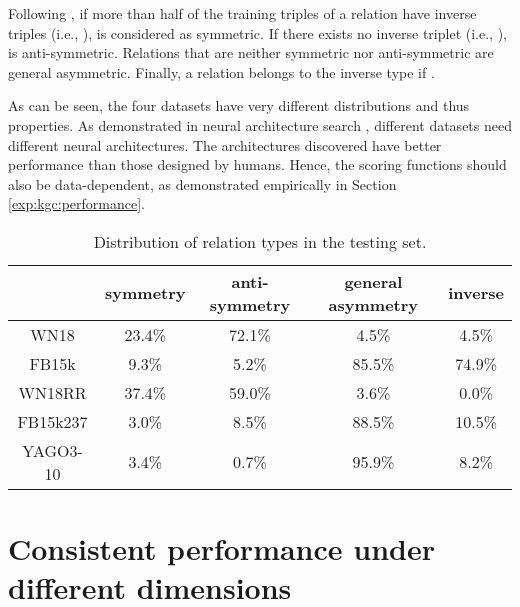 \documentclass[10pt,journal,compsoc]{IEEEtran}
\begin{document}
Following \cite{rossi2020knowledge},
if more than half of the training triples 
of a relation 
have
inverse triples 
(i.e.,
),
 is considered as symmetric.
If there exists no inverse triplet
(i.e., ),
 is anti-symmetric.
Relations that are neither 
symmetric nor
anti-symmetric
are general asymmetric.
Finally, a relation  belongs to the inverse type
if .


As can be seen, the four datasets have very 
different distributions and thus properties.
As demonstrated in neural architecture search
\cite{elsken2019neural,liu2018darts,zoph2017neural},
different datasets need different neural architectures.
The architectures discovered have better performance than those
designed by
humans.
Hence,
the scoring functions should also be data-dependent, 
as demonstrated empirically
in Section \ref{exp:kgc:performance}.

\begin{table}[ht]
	\centering
	\caption{Distribution of relation types in the testing set.}
	\label{tb:rel-distribution}
	\setlength\tabcolsep{3.1pt}
	\vspace{-10px}
	\begin{tabular}{c|ccc|c}
		\toprule
		& symmetry & anti-symmetry & general asymmetry & inverse \\  \midrule
		WN18     & 23.4\%    & 72.1\%         & 4.5\%      & 4.5\%   \\
		FB15k    & 9.3\%     & 5.2\%          & 85.5\%     & 74.9\%  \\
		WN18RR   & 37.4\%    & 59.0\%         & 3.6\%      & 0.0\%   \\
		FB15k237 & 3.0\%     & 8.5\%          & 88.5\%     & 10.5\%  \\
		YAGO3-10 & 3.4\%     & 0.7\%          & 95.9\%     & 8.2\%  \\
		\bottomrule
	\end{tabular}
\end{table}


\section{Consistent performance under different dimensions}
\label{sssec:transfer}
\end{document}
